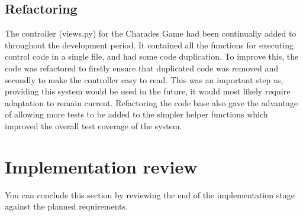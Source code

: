 \subsection{Refactoring}
The controller (views.py) for the Charades Game had been continually added to throughout the development period. It contained all the functions for executing control code in a single file, and had some code duplication. To improve this, the code was refactored to firstly ensure that duplicated code was removed and secondly to make the controller easy to read. This was an important step as, providing this system would be used in the future, it would most likely require adaptation to remain current. Refactoring the code base also gave the advantage of allowing more tests to be added to the simpler helper functions which improved the overall test coverage of the system.

\newpage

\section{Implementation review}
You can conclude this section by reviewing the end of the implementation stage against the planned requirements. 